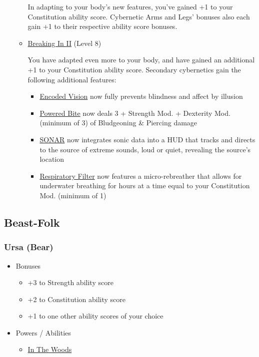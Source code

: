 \documentclass[12pt, landscape]{article}
\begin{document}
\begin{FlushLeft}
\begin{multicols}{2}
\begin{itemize}[wide]
\begin{itemize}
					In adapting to your body’s new features, you’ve gained +1 to your Constitution ability score.
					Cybernetic Arms and Legs' bonuses also each gain +1 to their respective ability score bonuses.

					\item \underline{Breaking In II} (Level 8)

					You have adapted even more to your body, and have gained an additional +1 to your Constitution ability score.
					Secondary cybernetics gain the following additional features:
					\begin{itemize}
						\item \underline{Encoded Vision} now fully prevents blindness and affect by illusion
						\item \underline{Powered Bite} now deals 3 + Strength Mod. + Dexterity Mod. (minimum of 3) of Bludgeoning \& Piercing damage
						\item \underline{SONAR} now integrates sonic data into a HUD that tracks and directs to the source of extreme sounds, loud or quiet, revealing the source's location
						\item \underline{Respiratory Filter} now features a micro-rebreather that allows for underwater breathing for hours at a time equal to your Constitution Mod. (minimum of 1)
					\end{itemize}
				\end{itemize}
			\end{itemize}
			\vfill \pagebreak

			\subsection{Beast-Folk}
			\subsubsection{Ursa (Bear)}
			\begin{itemize}[wide]
				\item Bonuses
				\begin{itemize}
					\item +3 to Strength ability score
					\item +2 to Constitution ability score
					\item +1 to one other ability scores of your choice
				\end{itemize}
				\item Powers / Abilities
				\begin{itemize}
					\item \underline{In The Woods}


\end{itemize}
\end{itemize}
\end{multicols}
\end{FlushLeft}
\end{document}
